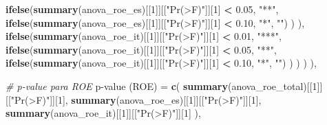 \documentclass[
]{article}
\newenvironment{Shaded}{\begin{snugshade}}{\end{snugshade}}
\newcommand{\AttributeTok}[1]{\textcolor[rgb]{0.13,0.29,0.53}{#1}}
\newcommand{\CommentTok}[1]{\textcolor[rgb]{0.56,0.35,0.01}{\textit{#1}}}
\newcommand{\DecValTok}[1]{\textcolor[rgb]{0.00,0.00,0.81}{#1}}
\newcommand{\FloatTok}[1]{\textcolor[rgb]{0.00,0.00,0.81}{#1}}
\newcommand{\FunctionTok}[1]{\textcolor[rgb]{0.13,0.29,0.53}{\textbf{#1}}}
\newcommand{\NormalTok}[1]{#1}
\newcommand{\OtherTok}[1]{\textcolor[rgb]{0.56,0.35,0.01}{#1}}
\newcommand{\SpecialCharTok}[1]{\textcolor[rgb]{0.81,0.36,0.00}{\textbf{#1}}}
\newcommand{\StringTok}[1]{\textcolor[rgb]{0.31,0.60,0.02}{#1}}
\begin{document}
\begin{Shaded}
\begin{Highlighting}[]
             \FunctionTok{ifelse}\NormalTok{(}\FunctionTok{summary}\NormalTok{(anova\_roe\_es)[[}\DecValTok{1}\NormalTok{]][[}\StringTok{"Pr(\textgreater{}F)"}\NormalTok{]][}\DecValTok{1}\NormalTok{] }\SpecialCharTok{\textless{}} \FloatTok{0.05}\NormalTok{, }\StringTok{"**"}\NormalTok{,}
                    \FunctionTok{ifelse}\NormalTok{(}\FunctionTok{summary}\NormalTok{(anova\_roe\_es)[[}\DecValTok{1}\NormalTok{]][[}\StringTok{"Pr(\textgreater{}F)"}\NormalTok{]][}\DecValTok{1}\NormalTok{] }\SpecialCharTok{\textless{}} \FloatTok{0.10}\NormalTok{,}
                           \StringTok{"*"}\NormalTok{, }\StringTok{""}\NormalTok{)}
\NormalTok{             )}
\NormalTok{      ),}
      \FunctionTok{ifelse}\NormalTok{(}\FunctionTok{summary}\NormalTok{(anova\_roe\_it)[[}\DecValTok{1}\NormalTok{]][[}\StringTok{"Pr(\textgreater{}F)"}\NormalTok{]][}\DecValTok{1}\NormalTok{] }\SpecialCharTok{\textless{}} \FloatTok{0.01}\NormalTok{, }\StringTok{"***"}\NormalTok{,}
             \FunctionTok{ifelse}\NormalTok{(}\FunctionTok{summary}\NormalTok{(anova\_roe\_it)[[}\DecValTok{1}\NormalTok{]][[}\StringTok{"Pr(\textgreater{}F)"}\NormalTok{]][}\DecValTok{1}\NormalTok{] }\SpecialCharTok{\textless{}} \FloatTok{0.05}\NormalTok{, }\StringTok{"**"}\NormalTok{,}
                    \FunctionTok{ifelse}\NormalTok{(}\FunctionTok{summary}\NormalTok{(anova\_roe\_it)[[}\DecValTok{1}\NormalTok{]][[}\StringTok{"Pr(\textgreater{}F)"}\NormalTok{]][}\DecValTok{1}\NormalTok{] }\SpecialCharTok{\textless{}} \FloatTok{0.10}\NormalTok{,}
                           \StringTok{"*"}\NormalTok{, }\StringTok{""}\NormalTok{)}
\NormalTok{             )}
\NormalTok{      )}
\NormalTok{    )}
\NormalTok{  ),}
  
  \CommentTok{\# p{-}value para ROE}
  \StringTok{\textasciigrave{}}\AttributeTok{p{-}value (ROE)}\StringTok{\textasciigrave{}} \OtherTok{=} \FunctionTok{c}\NormalTok{(}
    \FunctionTok{summary}\NormalTok{(anova\_roe\_total)[[}\DecValTok{1}\NormalTok{]][[}\StringTok{"Pr(\textgreater{}F)"}\NormalTok{]][}\DecValTok{1}\NormalTok{],}
    \FunctionTok{summary}\NormalTok{(anova\_roe\_es)[[}\DecValTok{1}\NormalTok{]][[}\StringTok{"Pr(\textgreater{}F)"}\NormalTok{]][}\DecValTok{1}\NormalTok{],}
    \FunctionTok{summary}\NormalTok{(anova\_roe\_it)[[}\DecValTok{1}\NormalTok{]][[}\StringTok{"Pr(\textgreater{}F)"}\NormalTok{]][}\DecValTok{1}\NormalTok{]}
\NormalTok{  ),}
  

\end{Highlighting}
\end{Shaded}
\end{document}
